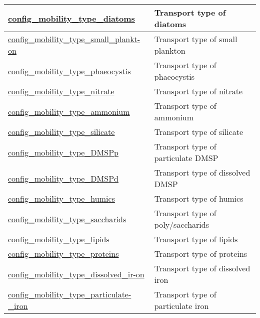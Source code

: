 {\begin{center}
\begin{longtable}{| p{2.0in} || p{4.0in} |}
    \hline
    \hyperref[subsec:nm_sec_config_mobility_type_diatoms]{config\_mobility\_type\_diatoms} & Transport type of diatoms \\
    \hline
    \hyperref[subsec:nm_sec_config_mobility_type_small_plankton]{config\_mobility\_type\_small\_plankt-}\hyperref[subsec:nm_sec_config_mobility_type_small_plankton]{on}& Transport type of small plankton \\
    \hline
    \hyperref[subsec:nm_sec_config_mobility_type_phaeocystis]{config\_mobility\_type\_phaeocystis} & Transport type of phaeocystis \\
    \hline
    \hyperref[subsec:nm_sec_config_mobility_type_nitrate]{config\_mobility\_type\_nitrate} & Transport type of nitrate \\
    \hline
    \hyperref[subsec:nm_sec_config_mobility_type_ammonium]{config\_mobility\_type\_ammonium} & Transport type of ammonium \\
    \hline
    \hyperref[subsec:nm_sec_config_mobility_type_silicate]{config\_mobility\_type\_silicate} & Transport type of silicate \\
    \hline
    \hyperref[subsec:nm_sec_config_mobility_type_DMSPp]{config\_mobility\_type\_DMSPp} & Transport type of particulate DMSP \\
    \hline
    \hyperref[subsec:nm_sec_config_mobility_type_DMSPd]{config\_mobility\_type\_DMSPd} & Transport type of dissolved DMSP \\
    \hline
    \hyperref[subsec:nm_sec_config_mobility_type_humics]{config\_mobility\_type\_humics} & Transport type of humics \\
    \hline
    \hyperref[subsec:nm_sec_config_mobility_type_saccharids]{config\_mobility\_type\_saccharids} & Transport type of poly/saccharids \\
    \hline
    \hyperref[subsec:nm_sec_config_mobility_type_lipids]{config\_mobility\_type\_lipids} & Transport type of lipids \\
    \hline
    \hyperref[subsec:nm_sec_config_mobility_type_proteins]{config\_mobility\_type\_proteins} & Transport type of proteins \\
    \hline
    \hyperref[subsec:nm_sec_config_mobility_type_dissolved_iron]{config\_mobility\_type\_dissolved\_ir-}\hyperref[subsec:nm_sec_config_mobility_type_dissolved_iron]{on}& Transport type of dissolved iron \\
    \hline
    \hyperref[subsec:nm_sec_config_mobility_type_particulate_iron]{config\_mobility\_type\_particulate-}\hyperref[subsec:nm_sec_config_mobility_type_particulate_iron]{\_iron}& Transport type of particulate iron \\

\end{longtable}
\end{center}}
